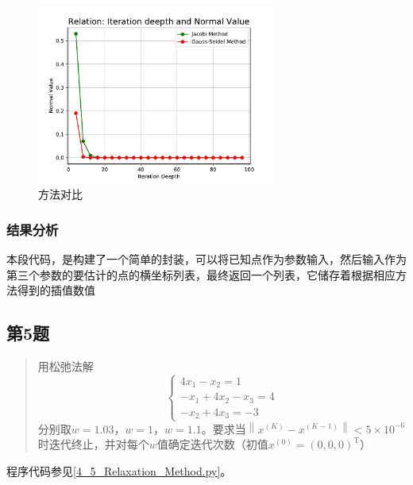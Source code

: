 \begin{figure}[H]
    \centering
    \includegraphics[width=0.7\textwidth]{../../img/04/compare.pdf}
    \caption{方法对比}
    \label{Fig:方法对比}
\end{figure}

\subsubsection{结果分析}
本段代码，是构建了一个简单的封装，可以将已知点作为参数输入，然后输入作为第三个参数的要估计的点的横坐标列表，最终返回一个列表，它储存着根据相应方法得到的插值数值


\subsection{第5题}
\begin{quote}
    {\kaishu
        用松弛法解
        \begin{equation}
            \left\{\begin{array}{r}{4 x_{1}-x_{2}=1} \\ {-x_{1}+4 x_{2}-x_{3}=4} \\ {-x_{2}+4 x_{3}=-3}\end{array}\right.
        \end{equation}
    分别取$w=1.03$，$w=1$，$w=1.1$。要求当$\left\|x^{(K)}-x^{(K-1)}\right\|<5 \times 10^{-6}$时迭代终止，并对每个$w$值确定迭代次数（初值$x^{(0)}=(0,0,0)^{\mathrm{T}}$）
    }
\end{quote}

程序代码参见\ref{4_5_Relaxation_Method.py}。

